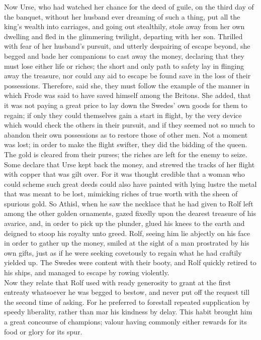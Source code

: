 \documentclass[10pt,a4paper]{report}
\begin{document}
Now Urse, who had watched her chance for the deed of guile, on the third day of the banquet, without her husband ever dreaming of such a thing, put all the king's wealth into carriages, and going out stealthily, stole away from her own dwelling and fled in the glimmering twilight, departing with her son. Thrilled with fear of her husband's pursuit, and utterly despairing of escape beyond, she begged and bade her companions to cast away the money, declaring that they must lose either life or riches; the short and only path to safety lay in flinging away the treasure, nor could any aid to escape be found save in the loss of their possessions. Therefore, said she, they must follow the example of the manner in which Frode was said to have saved himself among the Britons. She added, that it was not paying a great price to lay down the Swedes' own goods for them to regain; if only they could themselves gain a start in flight, by the very device which would check the others in their pursuit, and if they seemed not so much to abandon their own possessions as to restore those of other men. Not a moment was lost; in order to make the flight swifter, they did the bidding of the queen. The gold is cleared from their purses; the riches are left for the enemy to seize. Some declare that Urse kept back the money, and strewed the tracks of her flight with copper that was gilt over. For it was thought credible that a woman who could scheme such great deeds could also have painted with lying lustre the metal that was meant to be lost, mimicking riches of true worth with the sheen of spurious gold. So Athisl, when he saw the necklace that he had given to Rolf left among the other golden ornaments, gazed fixedly upon the dearest treasure of his avarice, and, in order to pick up the plunder, glued his knees to the earth and deigned to stoop his royalty unto greed. Rolf, seeing him lie abjectly on his face in order to gather up the money, smiled at the sight of a man prostrated by his own gifts, just as if he were seeking covetously to regain what he had craftily yielded up. The Swedes were content with their booty, and Rolf quickly retired to his ships, and managed to escape by rowing violently.\\

Now they relate that Rolf used with ready generosity to grant at the first entreaty whatsoever he was begged to bestow, and never put off the request till the second time of asking. For he preferred to forestall repeated supplication by speedy liberality, rather than mar his kindness by delay. This habit brought him a great concourse of champions; valour having commonly either rewards for its food or glory for its spur.\\
\end{document}
